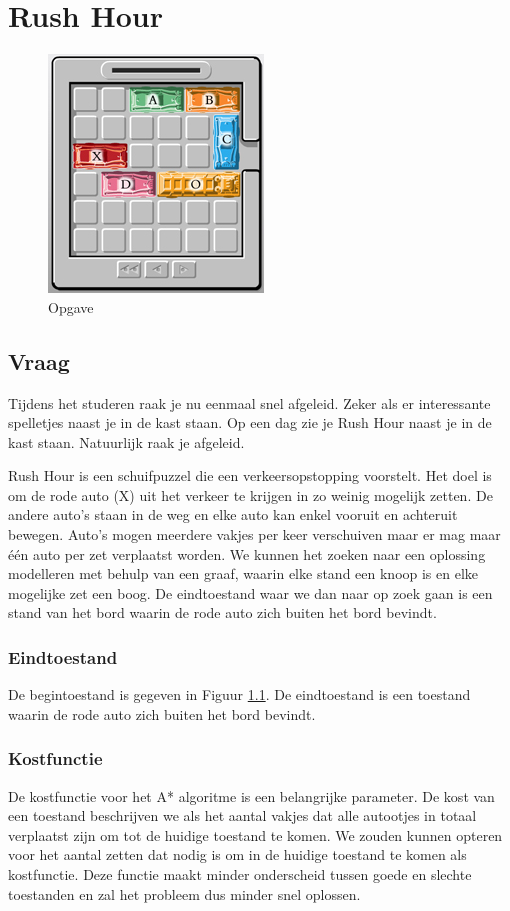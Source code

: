 \documentclass[alternative-exam.tex]{subfiles}
\begin{document}
\chapter{Rush Hour}
\begin{figure}[H]
\begin{center}
\includegraphics[scale=1.25]{resources/pictures/rushhour.jpg}
\end{center}
\caption{Opgave}
\label{rushour}
\end{figure}

\section{Vraag}
Tijdens het studeren raak je nu eenmaal snel afgeleid. Zeker als er interessante spelletjes naast je in de kast staan. Op een dag zie je Rush Hour naast je in de kast staan. Natuurlijk raak je afgeleid.

Rush Hour is een schuifpuzzel die een verkeersopstopping voorstelt. Het doel is om de rode auto (X) uit het verkeer te krijgen in zo weinig mogelijk zetten. De andere auto's staan in de weg en elke auto kan enkel vooruit en achteruit bewegen. Auto's mogen meerdere vakjes per keer verschuiven maar er mag maar \'e\'en auto per zet verplaatst worden.
We kunnen het zoeken naar een oplossing modelleren met behulp van een graaf, waarin elke stand een knoop is en elke mogelijke zet een boog. De eindtoestand waar we dan naar op zoek gaan is een stand van het bord waarin de rode auto zich buiten het bord bevindt.

\subsection{Eindtoestand} De begintoestand is gegeven in Figuur \ref{rushour}. De eindtoestand is een toestand waarin de rode auto zich buiten het bord bevindt. 

\subsection{Kostfunctie}De kostfunctie voor het A* algoritme is een belangrijke parameter. De kost van een toestand beschrijven we als het aantal vakjes dat alle autootjes in totaal verplaatst zijn om tot de huidige toestand te komen. We zouden kunnen opteren voor het aantal zetten dat nodig is om in de huidige toestand te komen als kostfunctie. Deze functie maakt minder onderscheid tussen goede en slechte toestanden en zal het probleem dus minder snel oplossen.
\end{document}
